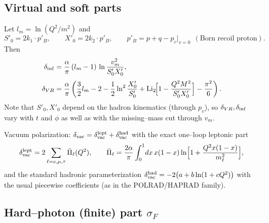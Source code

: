 \documentclass[11pt]{article}
\newcommand{\Li}{\mathrm{Li}_2}
\begin{document}
\subsection{Virtual and soft parts}

Let $l_m=\ln(Q^2/m^2)$ and
\begin{equation}
S'_0=2k_1\!\cdot\!p'_B,\qquad X'_0=2k_2\!\cdot\!p'_B,\qquad
p'_B=p+q-p_v\big|_{v=0}\ \ (\text{Born recoil proton}).
\end{equation}
Then
\begin{align}
\delta_{\rm inf}&=\frac{\alpha}{\pi}\,(l_m-1)\,
\ln\frac{v_m^2}{S'_0X'_0},
\label{eq:dinf}\\[1mm]
\delta_{VR}&=\frac{\alpha}{\pi}\left(
\frac32 l_m-2-\frac12\ln^2\frac{X'_0}{S'_0}
+\Li\!\Big[1-\frac{Q^2M^2}{S'_0X'_0}\Big]-\frac{\pi^2}{6}\right).
\label{eq:dvr}
\end{align}
Note that $S'_0,X'_0$ depend on the hadron kinematics (through $p_v$), so
$\delta_{VR},\delta_{\rm inf}$ vary with $t$ and $\phi$ as well as with the
missing--mass cut through $v_m$.

Vacuum polarization: $\delta_{\rm vac}=\delta^{\rm lept}_{\rm vac}
+\delta^{\rm had}_{\rm vac}$ with the exact one--loop leptonic part
\begin{equation}
\delta^{\rm lept}_{\rm vac}
=2\sum_{\ell=e,\mu,\tau}\bar\Pi_\ell(Q^2),\qquad
\bar\Pi_\ell=\frac{2\alpha}{\pi}\int_0^1\!dx\,x(1-x)
\ln\!\Big[1+\frac{Q^2x(1-x)}{m_\ell^2}\Big],
\end{equation}
and the standard hadronic parameterization
$\delta^{\rm had}_{\rm vac}=-2\big(a+b\ln(1+cQ^2)\big)$ with the usual
piecewise coefficients (as in the POLRAD/HAPRAD family).

\subsection{Hard--photon (finite) part $\sigma_F$}
\end{document}
